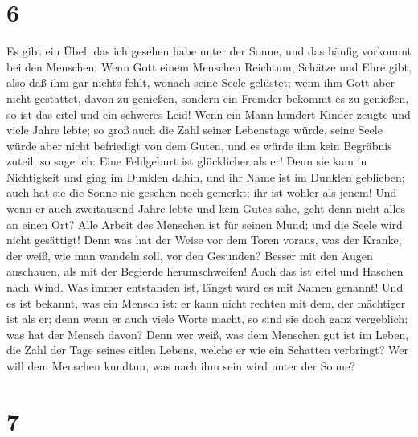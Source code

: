 \hypertarget{section-5}{%
\section{6}\label{section-5}}

 Es gibt ein Übel. das ich gesehen habe unter der Sonne,
und das häufig vorkommt bei den Menschen:  Wenn Gott einem
Menschen Reichtum, Schätze und Ehre gibt, also daß ihm gar nichts fehlt,
wonach seine Seele gelüstet; wenn ihm Gott aber nicht gestattet, davon
zu genießen, sondern ein Fremder bekommt es zu genießen, so ist das
eitel und ein schweres Leid!  Wenn ein Mann hundert Kinder
zeugte und viele Jahre lebte; so groß auch die Zahl seiner Lebenstage
würde, seine Seele würde aber nicht befriedigt von dem Guten, und es
würde ihm kein Begräbnis zuteil, so sage ich: Eine Fehlgeburt ist
glücklicher als er!  Denn sie kam in Nichtigkeit und ging
im Dunklen dahin, und ihr Name ist im Dunklen geblieben; 
auch hat sie die Sonne nie gesehen noch gemerkt; ihr ist wohler als
jenem!  Und wenn er auch zweitausend Jahre lebte und kein
Gutes sähe, geht denn nicht alles an einen Ort?  Alle
Arbeit des Menschen ist für seinen Mund; und die Seele wird nicht
gesättigt!  Denn was hat der Weise vor dem Toren voraus,
was der Kranke, der weiß, wie man wandeln soll, vor den Gesunden?
 Besser mit den Augen anschauen, als mit der Begierde
herumschweifen! Auch das ist eitel und Haschen nach Wind.
 Was immer entstanden ist, längst ward es mit Namen
genannt! Und es ist bekannt, was ein Mensch ist: er kann nicht rechten
mit dem, der mächtiger ist als er;  denn wenn er auch
viele Worte macht, so sind sie doch ganz vergeblich; was hat der Mensch
davon?  Denn wer weiß, was dem Menschen gut ist im Leben,
die Zahl der Tage seines eitlen Lebens, welche er wie ein Schatten
verbringt? Wer will dem Menschen kundtun, was nach ihm sein wird unter
der Sonne?

\hypertarget{section-6}{%
\section{7}\label{section-6}}

